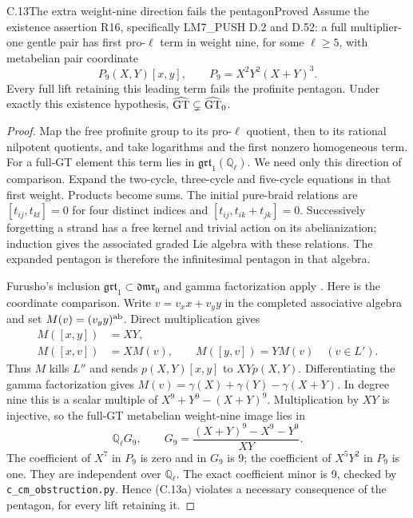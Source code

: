 \begin{statement}{C.13}{The extra weight-nine direction fails the pentagon}{Proved}
Assume the existence assertion R16, specifically
LM7\_PUSH D.2 and D.52: a full multiplier-one
gentle pair has first pro-\(\ell\) term in weight
nine, for some \(\ell\ge5\), with metabelian
pair coordinate
\[
 P_9(X,Y)[x,y],\qquad P_9=X^2Y^2(X+Y)^3.
 \tag{C.13a}
\]
Every full lift retaining this leading term
fails the profinite pentagon.
Under exactly this existence hypothesis,
\(\widehat{\rm GT}\subsetneq\widehat{\rm GT}_0\).
\end{statement}
\begin{proof}
Map the free profinite group to its pro-\(\ell\)
quotient, then to its rational nilpotent quotients,
and take logarithms and the first nonzero
homogeneous term. For a full-GT element this
term lies in \(\mathfrak{grt}_1(\mathbb Q_\ell)\).
We need only this direction of comparison.
Expand the two-cycle, three-cycle and five-cycle
equations in that first weight. Products become
sums. The initial pure-braid relations are
\([t_{ij},t_{kl}]=0\) for four distinct indices
and \([t_{ij},t_{ik}+t_{jk}]=0\).
Successively forgetting a strand has a free
kernel and trivial action on its abelianization;
induction gives the associated graded Lie
algebra with these relations. The expanded
pentagon is therefore the infinitesimal
pentagon in that algebra.

Furusho's inclusion
\(\mathfrak{grt}_1\subset\mathfrak{dmr}_0\)
and gamma factorization apply
\citep[Corollary 0.3, Theorem 0.5, \S5]{cFurusho2011}.
Here is the coordinate comparison.
Write \(v=v_xx+v_yy\) in the completed
associative algebra and set \(M(v)=(v_yy)^{\rm ab}\).
Direct multiplication gives
\[
 \begin{aligned}
 M([x,y])&=XY,\\
 M([x,v])&=XM(v),\qquad M([y,v])=YM(v)\quad(v\in L').
 \end{aligned}
 \tag{C.13b}
\]
Thus \(M\) kills \(L''\) and sends
\(p(X,Y)[x,y]\) to \(XYp(X,Y)\).
Differentiating the gamma factorization gives
\(M(v)=\gamma(X)+\gamma(Y)-\gamma(X+Y)\).
In degree nine this is a scalar multiple of
\(X^9+Y^9-(X+Y)^9\). Multiplication by \(XY\)
is injective, so the full-GT metabelian
weight-nine image lies in
\[
 \mathbb Q_\ell G_9,\qquad
 G_9=\frac{(X+Y)^9-X^9-Y^9}{XY}.
 \tag{C.13c}
\]
The coefficient of \(X^7\) in \(P_9\) is zero
and in \(G_9\) is 9; the coefficient of
\(X^5Y^2\) in \(P_9\) is one.
They are independent over \(\mathbb Q_\ell\).
The exact coefficient minor is 9, checked by
\texttt{c\_cm\_obstruction.py}.
Hence (C.13a) violates a necessary consequence
of the pentagon, for every lift retaining it.
\end{proof}

